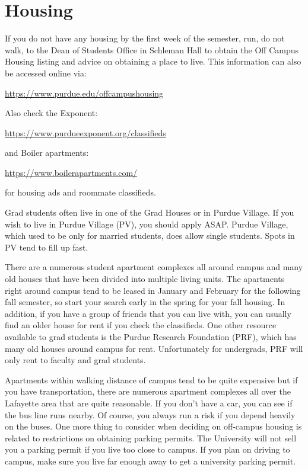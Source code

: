 \section{Housing}

If you do not have any housing by the first week of the semester, run, do not walk, to the Dean of Students Office in Schleman Hall to obtain the Off Campus Housing listing and advice on obtaining a place to live. This information can also be accessed online via:

\centerline{\url{https://www.purdue.edu/offcampushousing}}
\vspace{\baselineskip}

Also check the Exponent:

\centerline{\url{https://www.purdueexponent.org/classifieds}}
\vspace{\baselineskip}

and Boiler apartments:

\centerline{\url{https://www.boilerapartments.com/}}
\vspace{\baselineskip}

for housing ads and roommate classifieds.
\vspace{\baselineskip}

Grad students often live in one of the Grad Houses or in Purdue Village. If you wish to live in Purdue Village (PV), you should apply ASAP. Purdue Village, which used to be only for married students, does allow single students. Spots in PV tend to fill up fast.

There are a numerous student apartment complexes all around campus and many old houses that have been divided into multiple living units. The apartments right around campus tend to be leased in January and February for the following fall semester, so start your search early in the spring for your fall housing. In addition, if you have a group of friends that you can live with, you can usually find an older house for rent if you check the classifieds. One other resource available to grad students is the Purdue Research Foundation (PRF), which has many old houses around campus for rent. Unfortunately for undergrads, PRF will only rent to faculty and grad students.

Apartments within walking distance of campus tend to be quite expensive but if you have transportation, there are numerous apartment complexes all over the Lafayette area that are quite reasonable. If you don't have a car, you can see if the bus line runs nearby. Of course, you always run a risk if you depend heavily on the buses. One more thing to consider when deciding on off-campus housing is related to restrictions on obtaining parking permits. The University will not sell you a parking permit if you live too close to campus. If you plan on driving to campus, make sure you live far enough away to get a university parking permit.


